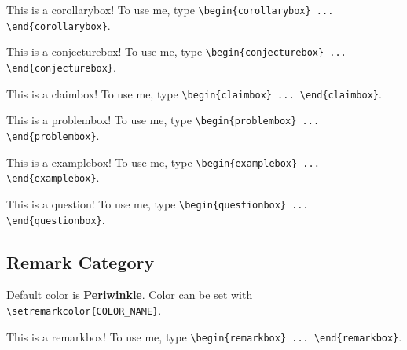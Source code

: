 \documentclass{scrartcl}
\begin{document}
\begin{corollarybox}
    This is a corollarybox! To use me, type \verb#\begin{corollarybox} ... \end{corollarybox}#.
\end{corollarybox}
\begin{conjecturebox}
    This is a conjecturebox! To use me, type \verb#\begin{conjecturebox} ... \end{conjecturebox}#.
\end{conjecturebox}
\begin{claimbox}
    This is a claimbox! To use me, type \verb#\begin{claimbox} ... \end{claimbox}#.
\end{claimbox}
\begin{problembox}
    This is a problembox!  To use me, type \verb#\begin{problembox} ... \end{problembox}#.
\end{problembox}
\begin{examplebox}
    This is a examplebox!  To use me, type \verb#\begin{examplebox} ... \end{examplebox}#.
\end{examplebox}
\begin{questionbox}
    This is a question!  To use me, type \verb#\begin{questionbox} ... \end{questionbox}#.
\end{questionbox}

\subsection{Remark Category}

Default color is \textbf{Periwinkle}. Color can be set with \verb#\setremarkcolor{COLOR_NAME}#. 

\begin{remarkbox}
    This is a remarkbox!  To use me, type \verb#\begin{remarkbox} ... \end{remarkbox}#.
\end{remarkbox}

\newpage
\end{document}
